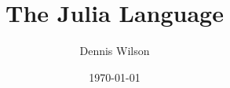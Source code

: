 \documentclass[xcolor=table]{beamer}
\title{The Julia Language}
\author{Dennis Wilson}
\date{\today}
\begin{document}
\maketitle

\frame{\tableofcontents}





\end{document}

